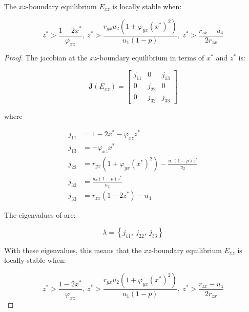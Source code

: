 \begin{theorem}\label{thm:eq-boundary-xz-stability}
    The $xz$-boundary equilibrium $E_{xz}$ is locally stable when:

    \begin{equation*}
        z^*>\frac{1-2x^*}{\varphi_{xz}},\ z^*>\frac{r_{yx}u_2\left(1+\varphi_{yx}\left(x^*\right)^2\right)}{u_1\left(1-p\right)},\ z^*>\frac{r_{zx}-u_4}{2r_{zx}}
    \end{equation*}
\end{theorem}
\begin{proof}
    The jacobian at the $xz$-boundary equilibrium in terms of $x^*$ and $z^*$ is:

    \begin{equation}\label{matrix:jacobian-boundary-xz}
        \textbf{J}\left(E_{xz}\right) = \begin{bmatrix}
            j_{11} & 0 & j_{13}\\
            0 & j_{22} & 0\\
            0 & j_{32} & j_{33}
        \end{bmatrix}
    \end{equation}

    where
    
    \begin{align*}
        j_{11} &= 1-2x^*-\varphi_{xz}z^*\\
        j_{13} &= -\varphi_{xz}x^*\\
        j_{22} &= r_{yx}\left(1+\varphi_{yx}\left(x^*\right)^2\right)-\frac{u_1\left(1-p\right)z^*}{u_2}\\
        j_{32} &= \frac{u_3\left(1-p\right)z^*}{u_2}\\
        j_{33} &= r_{zx}\left(1-2z^*\right)-u_4
    \end{align*}

    The eigenvalues of  are:
    
    \begin{equation*}
        \lambda=\left\{j_{11},\ j_{22},\ j_{33}\right\}
    \end{equation*}
    
    With these eigenvalues, this means that the $xz$-boundary equilibrium $E_{xz}$ is locally stable when:

    \begin{equation*}
        z^*>\frac{1-2x^*}{\varphi_{xz}},\ z^*>\frac{r_{yx}u_2\left(1+\varphi_{yx}\left(x^*\right)^2\right)}{u_1\left(1-p\right)},\ z^*>\frac{r_{zx}-u_4}{2r_{zx}}
    \end{equation*}
\end{proof}


